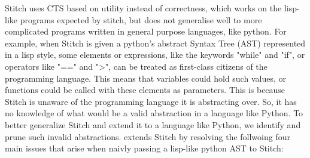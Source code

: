 Stitch uses CTS based on utility instead of correctness, which works on the lisp-like programs expected by stitch, but does not generalise well to more complicated programs written in general purpose languages, like python. 
For example, when Stitch is given a python's abstract Syntax Tree (AST) represented in a lisp style, 
some elements or expressions, like the keywords "while" and "if", or operators like "==" and ">", can be treated as first-class citizens of the programming language. This means that variables could hold such values, or functions could be called with these elements as parameters.
This is because Stitch is unaware of the programming language it is abstracting over. So, it has no knowledge of what would be a valid abstraction in a language like Python. 
To better generalize Stitch and extend it to a language like Python, we identify and prune such invalid abstractions. \toolname extends Stitch by resolving the follwoing four main issues that arise when naivly passing a lisp-like python AST to Stitch: 


